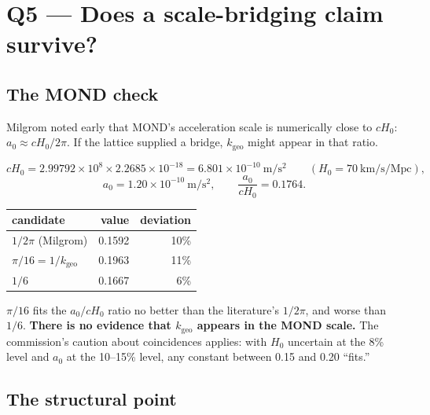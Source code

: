 \documentclass[11pt,letterpaper]{article}
\newcommand{\kgeo}{k_{\mathrm{geo}}}
\begin{document}
\section{Q5 --- Does a scale-bridging claim survive?}

\subsection{The MOND check}

Milgrom noted early that MOND's acceleration scale is numerically close to $cH_0$:
$a_0 \approx cH_0/2\pi$. If the lattice supplied a bridge, $\kgeo$ might appear in that ratio.

\begin{derivbox}
\[
cH_0 = 2.99792\times10^{8} \times 2.2685\times10^{-18} = 6.801\times10^{-10}~\mathrm{m/s^2}
\qquad (H_0 = 70~\mathrm{km/s/Mpc}),
\]
\[
a_0 = 1.20\times10^{-10}~\mathrm{m/s^2}, \qquad \frac{a_0}{cH_0} = 0.1764 .
\]
\begin{center}
\begin{tabular}{@{}lrr@{}}
\toprule
candidate & value & deviation \\
\midrule
$1/2\pi$ (Milgrom) & 0.1592 & 10\% \\
$\pi/16 = 1/\kgeo$ & 0.1963 & 11\% \\
$1/6$ & 0.1667 & 6\% \\
\bottomrule
\end{tabular}
\end{center}
\end{derivbox}

\begin{negbox}
$\pi/16$ fits the $a_0/cH_0$ ratio no better than the literature's $1/2\pi$, and worse than
$1/6$. \textbf{There is no evidence that $\kgeo$ appears in the MOND scale.} The
commission's caution about coincidences applies: with $H_0$ uncertain at the 8\% level and
$a_0$ at the 10--15\% level, any constant between 0.15 and 0.20 ``fits.''
\end{negbox}

\subsection{The structural point}
\end{document}
